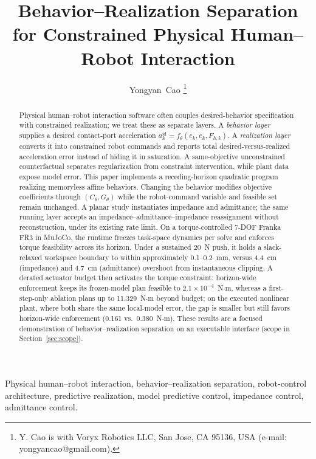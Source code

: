\documentclass[journal]{IEEEtran}
\begin{document}
\title{Behavior--Realization Separation for Constrained Physical Human--Robot Interaction}

\author{Yongyan~Cao%
\thanks{Y. Cao is with Voryx Robotics LLC, San Jose, CA 95136, USA
(e-mail: yongyancao@gmail.com).}}

\maketitle

\begin{abstract}
Physical human--robot interaction software often couples desired-behavior
specification with constrained realization; we treat these as separate
layers. A \emph{behavior layer} supplies a desired contact-port
acceleration $a_k^{\mathrm{id}}=f_\theta(e_k,\dot e_k,F_{h,k})$. A
\emph{realization layer} converts it into constrained robot commands and
reports total desired-versus-realized acceleration error instead of hiding
it in saturation. A same-objective unconstrained counterfactual separates
regularization from constraint intervention, while plant data expose model
error. This paper implements a receding-horizon
quadratic program realizing memoryless affine behaviors. Changing the
behavior modifies objective coefficients through $(C_\theta,G_\theta)$
while the robot-command variable and feasible set remain unchanged. A
planar study instantiates impedance and admittance; the same running
layer accepts an impedance--admittance--impedance reassignment without
reconstruction, under its existing rate limit. On a torque-controlled
7-DOF Franka FR3 in MuJoCo, the runtime freezes task-space dynamics per
solve and enforces torque feasibility across its horizon. Under a
sustained 20~N push, it holds a slack-relaxed workspace boundary to
within approximately 0.1--0.2~mm, versus 4.4~cm (impedance) and 4.7~cm
(admittance) overshoot from instantaneous clipping. A derated actuator
budget then activates the torque constraint: horizon-wide enforcement
keeps its frozen-model plan feasible to $2.1\times10^{-4}$~N$\cdot$m,
whereas a first-step-only ablation plans up to 11.329~N$\cdot$m beyond budget; on
the executed nonlinear plant, where both share the same local-model
error, the gap is smaller but still favors horizon-wide enforcement
(0.161 vs.\ 0.380~N$\cdot$m). These results are a focused demonstration of
behavior--realization separation on an executable interface
(scope in Section~\ref{sec:scope}).
\end{abstract}

\begin{IEEEkeywords}
Physical human--robot interaction, behavior--realization separation,
robot-control architecture, predictive realization, model predictive
control, impedance control, admittance control.
\end{IEEEkeywords}
\end{document}
